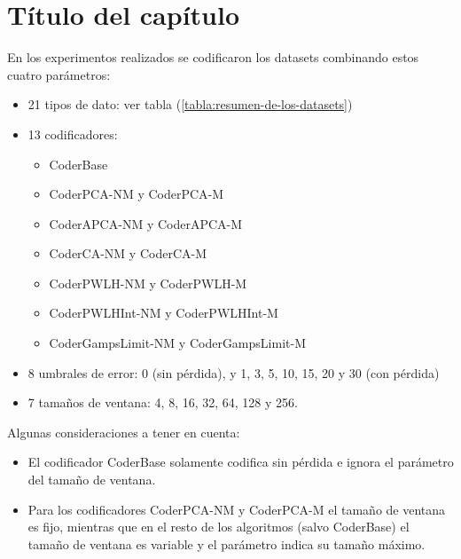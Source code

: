 
\chapter{Título del capítulo} %

\label{Capitulo1} %


\newcommand{\maskalgo}{\textit{M}}
\newcommand{\NOmaskalgo}{\textit{NM}}
\newcommand{\difrelativa}{\textit{DiferenciaRelativa}}


\clearpage


En los experimentos realizados se codificaron los datasets combinando estos cuatro parámetros:
\vspace{-8pt}
\begin{itemize}
    \item 21 tipos de dato: ver tabla (\ref{tabla:resumen-de-los-datasets})
    \item 13 codificadores: 
        \begin{itemize}
            \item CoderBase
            \item CoderPCA-NM y CoderPCA-M
            \item CoderAPCA-NM y CoderAPCA-M
            \item CoderCA-NM y CoderCA-M
            \item CoderPWLH-NM y CoderPWLH-M
            \item CoderPWLHInt-NM y CoderPWLHInt-M
            \item CoderGampsLimit-NM y CoderGampsLimit-M
        \end{itemize}
    \item 8 umbrales de error: 0 (sin pérdida), y 1, 3, 5, 10, 15, 20 y 30 (con pérdida)
    \item 7 tamaños de ventana: 4, 8, 16, 32, 64, 128 y 256.
\end{itemize}

Algunas consideraciones a tener en cuenta:
\vspace{-8pt}
\begin{itemize}
    \item El codificador CoderBase solamente codifica sin pérdida e ignora el parámetro del tamaño de ventana. 
    \item Para los codificadores CoderPCA-NM y CoderPCA-M el tamaño de ventana es fijo, mientras que en el resto de los algoritmos (salvo CoderBase) el tamaño de ventana es variable y el parámetro indica su tamaño máximo.
\end{itemize}

